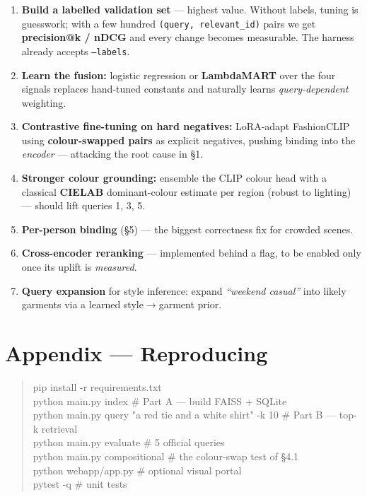 \documentclass[10pt,a4paper]{article}
\newcommand{\tcode}[1]{\texttt{\small #1}}
\begin{document}
\begin{enumerate}
  \item \textbf{Build a labelled validation set} --- highest value. Without labels, tuning is
  guesswork; with a few hundred \tcode{(query, relevant\_id)} pairs we get \textbf{precision@k /
  nDCG} and every change becomes measurable. The harness already accepts \tcode{--labels}.
  \item \textbf{Learn the fusion:} logistic regression or \textbf{LambdaMART} over the four signals
  replaces hand-tuned constants and naturally learns \emph{query-dependent} weighting.
  \item \textbf{Contrastive fine-tuning on hard negatives:} LoRA-adapt FashionCLIP using
  \textbf{colour-swapped pairs} as explicit negatives, pushing binding into the \emph{encoder} ---
  attacking the root cause in \S1.
  \item \textbf{Stronger colour grounding:} ensemble the CLIP colour head with a classical
  \textbf{CIELAB} dominant-colour estimate per region (robust to lighting) --- should lift queries
  1, 3, 5.
  \item \textbf{Per-person binding} (\S5) --- the biggest correctness fix for crowded scenes.
  \item \textbf{Cross-encoder reranking} --- implemented behind a flag, to be enabled only once its
  uplift is \emph{measured}.
  \item \textbf{Query expansion} for style inference: expand \emph{``weekend casual''} into likely
  garments via a learned style$\rightarrow$garment prior.
\end{enumerate}

\section*{Appendix --- Reproducing}

\begin{quote}\small\ttfamily
pip install -r requirements.txt\\
python main.py index \hfill \# Part A --- build FAISS + SQLite\\
python main.py query "a red tie and a white shirt" -k 10 \hfill \# Part B --- top-k retrieval\\
python main.py evaluate \hfill \# 5 official queries\\
python main.py compositional \hfill \# the colour-swap test of \S4.1\\
python webapp/app.py \hfill \# optional visual portal\\
pytest -q \hfill \# unit tests
\end{quote}
\end{document}
